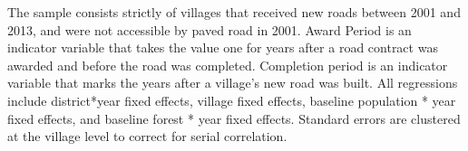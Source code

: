 The sample consists strictly of villages that received new roads
between 2001 and 2013, and were not accessible by paved road in
2001. Award Period is an indicator variable that takes the value one
for years after a road contract was awarded and before the road was
completed. Completion period is an indicator variable that marks the
years after a village's new road was built. All regressions include
district*year fixed effects, village fixed effects, baseline
population * year fixed effects, and baseline forest * year fixed
effects. Standard errors are clustered at the village level to correct
for serial correlation.
